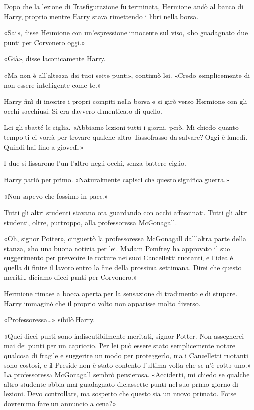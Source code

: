 Dopo che la lezione di Trasfigurazione fu terminata, Hermione andò al banco di Harry, proprio mentre Harry stava rimettendo i libri nella borsa.

«Sai», disse Hermione con un’espressione innocente sul viso, «ho guadagnato due punti per Corvonero oggi.»

«Già», disse laconicamente Harry.

«Ma non è all’altezza dei tuoi sette punti», continuò lei. «Credo semplicemente di non essere intelligente come te.»

Harry finì di inserire i propri compiti nella borsa e si girò verso Hermione con gli occhi socchiusi. Si era davvero dimenticato di quello.

Lei gli sbatté le ciglia. «Abbiamo lezioni tutti i giorni, però. Mi chiedo quanto tempo ti ci vorrà per trovare qualche altro Tassofrasso da salvare? Oggi è lunedì. Quindi hai fino a giovedì.»

I due si fissarono l’un l’altro negli occhi, senza battere ciglio.

Harry parlò per primo. «Naturalmente capisci che questo significa guerra.»

«Non sapevo che fossimo in pace.»

Tutti gli altri studenti stavano ora guardando con occhi affascinati. Tutti gli altri studenti, oltre, purtroppo, alla professoressa McGonagall.

«Oh, signor Potter», cinguettò la professoressa McGonagall dall’altra parte della stanza, «ho una buona notizia per lei. Madam Pomfrey ha approvato il suo suggerimento per prevenire le rotture nei suoi Cancelletti ruotanti, e l’idea è quella di finire il lavoro entro la fine della prossima settimana. Direi che questo meriti… diciamo dieci punti per Corvonero.»

Hermione rimase a bocca aperta per la sensazione di tradimento e di stupore. Harry immaginò che il proprio volto non apparisse molto diverso.

«Professoressa…» sibilò Harry.

«Quei dieci punti sono indiscutibilmente meritati, signor Potter. Non assegnerei mai dei punti per un capriccio. Per lei può essere stato semplicemente notare qualcosa di fragile e suggerire un modo per proteggerlo, ma i Cancelletti ruotanti sono costosi, e il Preside non è stato contento l’ultima volta che se n’è rotto uno.» La professoressa McGonagall sembrò pensierosa. «Accidenti, mi chiedo se qualche altro studente abbia mai guadagnato diciassette punti nel suo primo giorno di lezioni. Devo controllare, ma sospetto che questo sia un nuovo primato. Forse dovremmo fare un annuncio a cena?»

